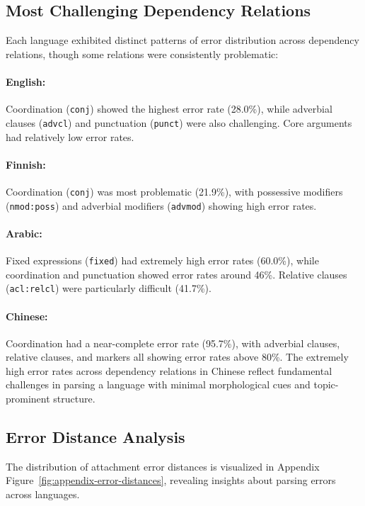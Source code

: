 \documentclass[11pt]{article}
\begin{document}
\subsection{Most Challenging Dependency Relations}

Each language exhibited distinct patterns of error distribution across dependency relations, though some relations were consistently problematic:

\paragraph{English:} Coordination (\texttt{conj}) showed the highest error rate (28.0\%), while adverbial clauses (\texttt{advcl}) and punctuation (\texttt{punct}) were also challenging. Core arguments had relatively low error rates.

\paragraph{Finnish:} Coordination (\texttt{conj}) was most problematic (21.9\%), with possessive modifiers (\texttt{nmod:poss}) and adverbial modifiers (\texttt{advmod}) showing high error rates.

\paragraph{Arabic:} Fixed expressions (\texttt{fixed}) had extremely high error rates (60.0\%), while coordination and punctuation showed error rates around 46\%. Relative clauses (\texttt{acl:relcl}) were particularly difficult (41.7\%).

\paragraph{Chinese:} Coordination had a near-complete error rate (95.7\%), with adverbial clauses, relative clauses, and markers all showing error rates above 80\%. The extremely high error rates across dependency relations in Chinese reflect fundamental challenges in parsing a language with minimal morphological cues and topic-prominent structure.

\subsection{Error Distance Analysis}

The distribution of attachment error distances is visualized in Appendix Figure~\ref{fig:appendix-error-distances}, revealing insights about parsing errors across languages.
\end{document}

